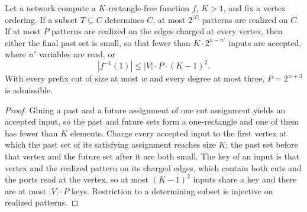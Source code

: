 \begin{lemma}
  \label{lem:lowerbounds-algebraic-cut-counting}
  \leanok
  Let a network compute a $K$-rectangle-free function $f$, $K>1$, and fix a
  vertex ordering. If a subset $T\subseteq C$ determines $C$, at most
  $2^{|T|}$ patterns are realized on $C$. If at most $P$ patterns are
  realized on the edges charged at every vertex, then either the final past
  set is small, so that fewer than $K\cdot 2^{n-n'}$ inputs are accepted,
  where $n'$ variables are read, or
  \[
    |f^{-1}(1)| \le |V|\cdot P\cdot (K-1)^2 .
  \]
  With every prefix cut of size at most $w$ and every degree at most three,
  $P=2^{w+3}$ is admissible.
\end{lemma}
\begin{proof}
  \leanok
  Gluing a past and a future assignment of one cut assignment yields an
  accepted input, so the past and future sets form a one-rectangle and one
  of them has fewer than $K$ elements. Charge every accepted input to the
  first vertex at which the past set of its satisfying assignment reaches
  size $K$; the past set before that vertex and the future set after it are
  both small. The key of an input is that vertex and the realized pattern on
  its charged edges, which contain both cuts and the ports read at the
  vertex, so at most $(K-1)^2$ inputs share a key and there are at most
  $|V|\cdot P$ keys. Restriction to a determining subset is injective on
  realized patterns.
\end{proof}

